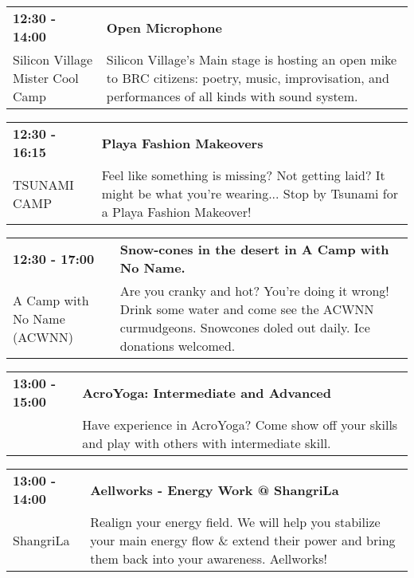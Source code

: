 \begin{tabular}{ p{1in} p{2.2in} }
    \textbf{12:30 - 14:00} & \textbf{Open Microphone} \\
    Silicon Village \newline Mister Cool Camp & Silicon Village's Main stage is hosting an open mike to BRC citizens: poetry, music, improvisation, and performances of all kinds with sound system. \\
    \hline 
\end{tabular}
    
\begin{tabular}{ p{1in} p{2.2in} }
    \textbf{12:30 - 16:15} & \textbf{Playa Fashion Makeovers} \\
    TSUNAMI CAMP \newline  & Feel like something is missing?  Not getting laid?  It might be what you're wearing...  Stop by Tsunami for a Playa Fashion Makeover! \\
    \hline 
\end{tabular}
    
\begin{tabular}{ p{1in} p{2.2in} }
    \textbf{12:30 - 17:00} & \textbf{Snow-cones in the desert in A Camp with No Name.} \\
    A Camp with No Name (ACWNN) \newline  & Are you cranky and hot? You're doing it wrong! Drink some water and come see the ACWNN curmudgeons. Snowcones doled out daily. Ice donations welcomed. \\
    \hline 
\end{tabular}
    
\begin{tabular}{ p{1in} p{2.2in} }
    \textbf{13:00 - 15:00} & \textbf{AcroYoga: Intermediate and Advanced} \\
    ~ \newline  & Have experience in AcroYoga? Come show off your skills and play with others with intermediate skill. \\
    \hline 
\end{tabular}
    
\begin{tabular}{ p{1in} p{2.2in} }
    \textbf{13:00 - 14:00} & \textbf{Aellworks - Energy Work @ ShangriLa} \\
    ShangriLa \newline  & Realign your energy field. We will help you stabilize your main energy flow \& extend their power and bring them back into your awareness. Aellworks! \\
    \hline 
\end{tabular}
    
